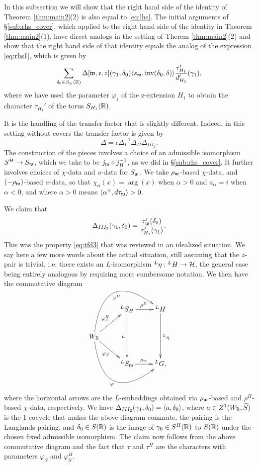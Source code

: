 \documentclass{article}
\theoremstyle{definition}
\numberwithin{equation}{section}
\renewcommand{\-}{\hyp{}}
\begin{document}
In this subsection we will show that the right hand side of the identity of Theorem \ref{thm:main2}(2) is also equal to \eqref{eq:lhs}. The initial arguments of \S\ref{sub:rhs_cover}, which applied to the right hand side of the identity in Theorem \ref{thm:main2}(1), have direct analogs in the setting of Therem \ref{thm:main2}(2) and show that the right hand side of that identity equals the analog of the expression \eqref{eq:rhs1}, which is given by
\begin{equation} \label{eq:rhs2}
\sum_{\delta_0 \in S_{\mathfrak{w}}(\mathbb{R})} \Delta[\mathfrak{w},\mathfrak{e},z](\gamma_1,\delta_0)\langle s_{\mathfrak{w}},\textrm{inv}(\delta_0,\delta)\rangle \frac{\tau'_{H_1}}{d'_{H_1}}(\gamma_1),	
\end{equation}
where we have used the parameter $\varphi_1$ of the z-extension $H_1$ to obtain the character $\tau_{H_1}'$ of the torus $S_{H_1}(\mathbb{R})$.


It is the handling of the transfer factor that is slightly different. Indeed, in this setting without covers the transfer factor is given by
\[ \Delta = \epsilon\Delta_I^{-1}\Delta_{II}\Delta_{III_2}. \]
The construction of the pieces involves a choice of an admissible isomorphism $S^H \to S_{\mathfrak{w}}$, which we take to be $j_{\mathfrak{w}}\circ j_H^{-1}$, as we did in \S\ref{sub:rhs_cover}. It further involves choices of $\chi$-data and $a$-data for $S_{\mathfrak{w}}$. We take $\rho_{\mathfrak{w}}$-based $\chi$-data, and $(-\rho_{\mathfrak{w}})$-based $a$-data, so that $\chi_\alpha(x)=\arg(x)$ when $\alpha>0$ and $a_\alpha=i$ when $\alpha<0$, and where $\alpha>0$ means $\langle\alpha^\vee,d\tau_{\mathfrak{w}}\rangle>0$.

We claim that
\[ \Delta_{III_2}(\gamma_1,\delta_0) = \frac{\tau'_{\mathfrak{w}}(\delta_0)}{\tau'_{H_1}(\gamma_1)}.\]
This was the property \eqref{eq:tfd3} that was reviewed in an idealized situation. We say here a few more words about the actual situation, still assuming that the $z$-pair is trivial, i.e. there exists an $L$\-isomorphism $^L\eta : {^LH} \to \mathcal{H}$, the general case being entirely analogous by requiring more cumbersome notation. We then have the commutative diagram
\[ \xymatrix{
	&^LS_H\ar[dd]_a\ar[r]^{\rho^H}&^LH\ar[dd]^{^L\eta}\\
	W_\R\ar[ru]^{\varphi^H_S}\ar@/^4pc/[rru]_-{\varphi^H}\ar[rd]_{\varphi_S}\ar@/_4pc/[rrd]_-{\varphi}\\
	&^LS_\mf{w}\ar[r]^{\rho_\mf{w}}&^LG,
}
\]
where the horizontal arrows are the $L$\-embeddings obtained via $\rho_{\mathfrak{w}}$-based and $\rho^H$-based $\chi$-data, respectively. We have $\Delta_{III_2}(\gamma_1,\delta_0)=\langle a,\delta_0\rangle$, where $a \in Z^1(W_{\mathbb{R}},\widehat S)$ is the $1$-cocycle that makes the above diagram commute, the pairing is the Langlands pairing, and $\delta_0 \in S(\mathbb{R})$ is the image of $\gamma_0 \in S^H(\mathbb{R})$ to $S(\mathbb{R})$ under the chosen fixed admissible isomorphism. The claim now follows from the above commutative diagram and the fact that $\tau$ and $\tau^H$ are the characters with parameters $\varphi_S$ and $\varphi_S^H$.
\end{document}
